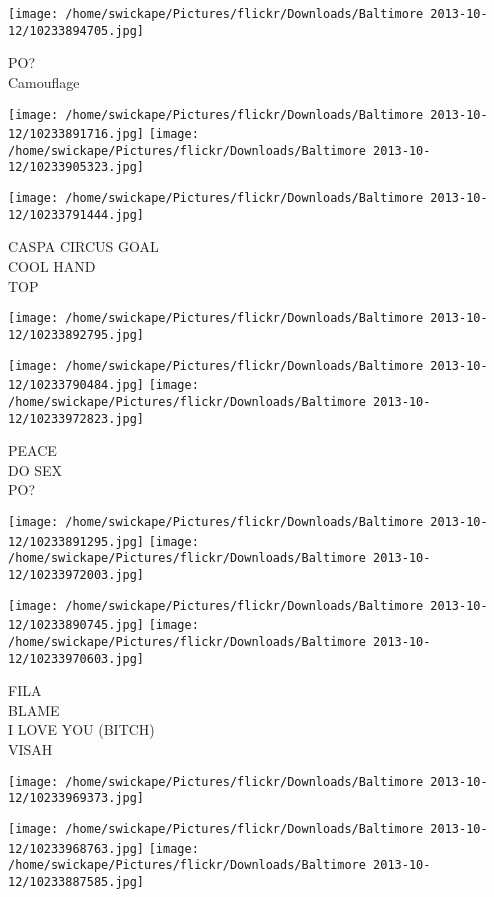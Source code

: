 \documentclass[10pt,letterpaper]{article}
\begin{document}
\vspace{0.25in}
\texttt{[image: /home/swickape/Pictures/flickr/Downloads/Baltimore 2013-10-12/10233894705.jpg]}

PO?\\
Camouflage
\pagebreak

\texttt{[image: /home/swickape/Pictures/flickr/Downloads/Baltimore 2013-10-12/10233891716.jpg]}
\texttt{[image: /home/swickape/Pictures/flickr/Downloads/Baltimore 2013-10-12/10233905323.jpg]}

\vspace{0.25in}
\texttt{[image: /home/swickape/Pictures/flickr/Downloads/Baltimore 2013-10-12/10233791444.jpg]}

CASPA CIRCUS GOAL\\
COOL HAND\\
TOP
\pagebreak

\texttt{[image: /home/swickape/Pictures/flickr/Downloads/Baltimore 2013-10-12/10233892795.jpg]}

\vspace{0.25in}
\texttt{[image: /home/swickape/Pictures/flickr/Downloads/Baltimore 2013-10-12/10233790484.jpg]}
\texttt{[image: /home/swickape/Pictures/flickr/Downloads/Baltimore 2013-10-12/10233972823.jpg]}

PEACE\\
DO SEX\\
PO?
\pagebreak

\texttt{[image: /home/swickape/Pictures/flickr/Downloads/Baltimore 2013-10-12/10233891295.jpg]}
\texttt{[image: /home/swickape/Pictures/flickr/Downloads/Baltimore 2013-10-12/10233972003.jpg]}

\texttt{[image: /home/swickape/Pictures/flickr/Downloads/Baltimore 2013-10-12/10233890745.jpg]}
\texttt{[image: /home/swickape/Pictures/flickr/Downloads/Baltimore 2013-10-12/10233970603.jpg]}

FILA\\
BLAME\\
I LOVE YOU (BITCH)\\
VISAH
\pagebreak

\texttt{[image: /home/swickape/Pictures/flickr/Downloads/Baltimore 2013-10-12/10233969373.jpg]}

\vspace{0.25in}
\texttt{[image: /home/swickape/Pictures/flickr/Downloads/Baltimore 2013-10-12/10233968763.jpg]}
\texttt{[image: /home/swickape/Pictures/flickr/Downloads/Baltimore 2013-10-12/10233887585.jpg]}
\end{document}
